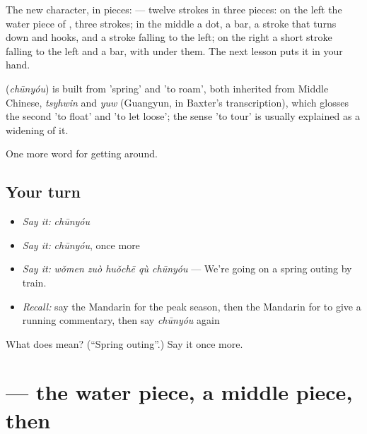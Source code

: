 The new character, in pieces:  — twelve strokes in three pieces: on the left the water piece of , three strokes; in the middle a dot, a bar, a stroke that turns down and hooks, and a stroke falling to the left; on the right a short stroke falling to the left and a bar, with  under them. The next lesson puts it in your hand.

\begin{cousinweb}
\textbf{} (\emph{chūnyóu}) is built from  'spring' and  'to roam', both inherited from Middle Chinese, \emph{tsyhwin} and \emph{yuw} (Guangyun, in Baxter's transcription), which glosses the second 'to float' and 'to let loose'; the sense 'to tour' is usually explained as a widening of it.
\end{cousinweb}

\begin{grammarlens}[title={What you've built}]
One more word for getting around.
\end{grammarlens}

\subsection*{Your turn}
\begin{itemize}
\raggedright
  \item \emph{Say it:} \emph{chūnyóu}
  \item \emph{Say it:} \emph{chūnyóu}, once more
  \item \emph{Say it:} \emph{wǒmen zuò huǒchē qù chūnyóu} — We're going on a spring outing by train.
  \item \emph{Recall:} say the Mandarin for the peak season, then the Mandarin for to give a running commentary, then say \emph{chūnyóu} again
\end{itemize}

\begin{tcolorbox}[breakable,colback=teal!4,colframe=teal!35!black,title={Before you move on}]
What does  mean? (\textquotedblleft{}Spring outing\textquotedblright{}.) Say it once more.
\end{tcolorbox}
\section[\texorpdfstring{\zh{游} (yóu)}{游 (yóu)}]{ — the water piece, a middle piece, then }

\label{lesson:ZH-W431-you-tour}



